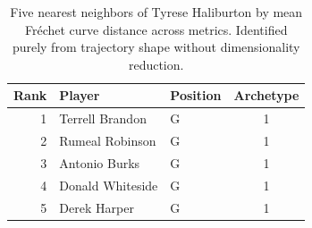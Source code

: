 \begin{table}[htbp]
  \centering\small
  \begin{tabular}{rllc}
    \toprule
    Rank & Player & Position & Archetype \\
    \midrule
    1 & Terrell Brandon & G & 1 \\
    2 & Rumeal Robinson & G & 1 \\
    3 & Antonio Burks & G & 1 \\
    4 & Donald Whiteside & G & 1 \\
    5 & Derek Harper & G & 1 \\
    \bottomrule
  \end{tabular}
  \caption{Five nearest neighbors of Tyrese Haliburton by mean Fr\'{e}chet curve distance across metrics. Identified purely from trajectory shape without dimensionality reduction.}
  \label{tab:Tyrese_Haliburton_frechet_curve_neighbors}
\end{table}

